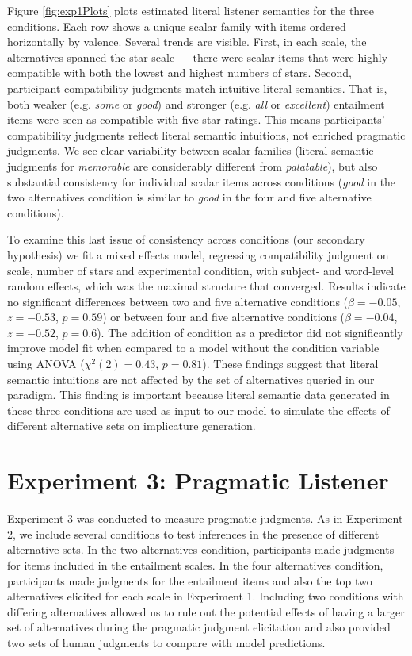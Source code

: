 \documentclass[10pt, letterpaper]{article}
\begin{document}
Figure \ref{fig:exp1Plots} plots estimated literal listener semantics
for the three conditions. Each row shows a unique scalar family with
items ordered horizontally by valence. Several trends are visible.
First, in each scale, the alternatives spanned the star scale --- there
were scalar items that were highly compatible with both the lowest and
highest numbers of stars. Second, participant compatibility judgments
match intuitive literal semantics. That is, both weaker (e.g.
\emph{some} or \emph{good}) and stronger (e.g. \emph{all} or
\emph{excellent}) entailment items were seen as compatible with
five-star ratings. This means participants' compatibility judgments
reflect literal semantic intuitions, not enriched pragmatic judgments.
We see clear variability between scalar families (literal semantic
judgments for \emph{memorable} are considerably different from
\emph{palatable}), but also substantial consistency for individual
scalar items across conditions (\emph{good} in the two alternatives
condition is similar to \emph{good} in the four and five alternative
conditions).

To examine this last issue of consistency across conditions (our
secondary hypothesis) we fit a mixed effects model, regressing
compatibility judgment on scale, number of stars and experimental
condition, with subject- and word-level random effects, which was the
maximal structure that converged. Results indicate no significant
differences between two and five alternative conditions
(\(\beta=-0.05\), \(z = -0.53\), \(p = 0.59\)) or between four and five
alternative conditions (\(\beta = -0.04\), \(z = -0.52\), \(p = 0.6\)).
The addition of condition as a predictor did not significantly improve
model fit when compared to a model without the condition variable using
ANOVA (\(\chi^2(2) = 0.43\), \(p = 0.81\)). These findings suggest that
literal semantic intuitions are not affected by the set of alternatives
queried in our paradigm. This finding is important because literal
semantic data generated in these three conditions are used as input to
our model to simulate the effects of different alternative sets on
implicature generation.

\section{Experiment 3: Pragmatic
Listener}\label{experiment-3-pragmatic-listener}

Experiment 3 was conducted to measure pragmatic judgments. As in
Experiment 2, we include several conditions to test inferences in the
presence of different alternative sets. In the two alternatives
condition, participants made judgments for items included in the
entailment scales. In the four alternatives condition, participants made
judgments for the entailment items and also the top two alternatives
elicited for each scale in Experiment 1. Including two conditions with
differing alternatives allowed us to rule out the potential effects of
having a larger set of alternatives during the pragmatic judgment
elicitation and also provided two sets of human judgments to compare
with model predictions.
\end{document}
